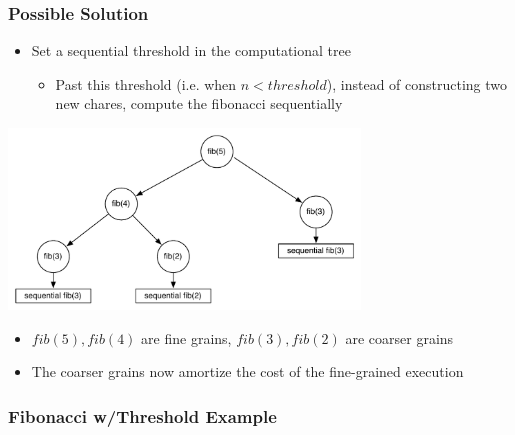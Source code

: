 \documentclass{beamer}
\begin{document}
\begin{frame}[fragile]
  \frametitle{Possible Solution}
  \begin{itemize}
  \item Set a sequential threshold in the computational tree
    \begin{itemize}
    \item Past this threshold (i.e. when $n < threshold$), instead of
      constructing two new chares, compute the fibonacci sequentially
    \end{itemize}
  \end{itemize}
  \begin{center} \includegraphics[width=0.7\textwidth]{diagrams/tree-threshold.pdf} \end{center}
  \begin{itemize}
    \item $fib(5), fib(4)$ are fine grains, $fib(3), fib(2)$ are coarser grains
    \item The coarser grains now amortize the cost of the fine-grained execution
  \end{itemize}
\end{frame}

\begin{frame}[fragile]
  \frametitle{Fibonacci w/Threshold Example}
  
\end{frame}
\end{document}

